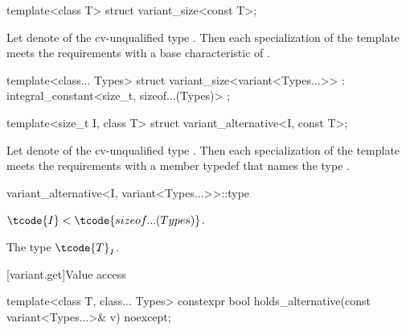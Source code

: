 %
\begin{itemdecl}
template<class T> struct variant_size<const T>;
\end{itemdecl}

\begin{itemdescr}
\pnum
Let  denote  of the cv-unqualified
type . Then each specialization of the template meets the
 requirements with a
base characteristic of .
\end{itemdescr}

%
\begin{itemdecl}
template<class... Types>
  struct variant_size<variant<Types...>> : integral_constant<size_t, sizeof...(Types)> { };
\end{itemdecl}

%
\begin{itemdecl}
template<size_t I, class T> struct variant_alternative<I, const T>;
\end{itemdecl}

\begin{itemdescr}
\pnum
Let  denote  of the
cv-unqualified type . Then each specialization of the template
meets the  requirements with a
member typedef  that names the type .
\end{itemdescr}

%
\begin{itemdecl}
variant_alternative<I, variant<Types...>>::type
\end{itemdecl}

\begin{itemdescr}
\pnum
\mandates
$\tcode{I} < \tcode{sizeof...(Types)}$.

\pnum
\ctype
The type $\tcode{T}_I$.
\end{itemdescr}

[variant.get]{Value access}

\begin{itemdecl}
template<class T, class... Types>
  constexpr bool holds_alternative(const variant<Types...>& v) noexcept;
\end{itemdecl}

